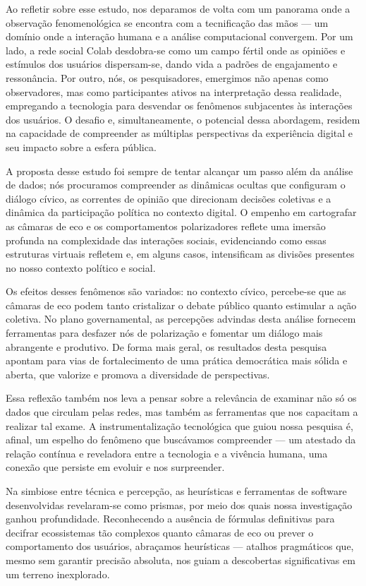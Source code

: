 Ao refletir sobre esse estudo, nos deparamos de volta com um panorama onde a observação fenomenológica se encontra com a tecnificação das mãos — um domínio onde a interação humana e a análise computacional convergem. Por um lado, a rede social Colab desdobra-se como um campo fértil onde as opiniões e estímulos dos usuários dispersam-se, dando vida a padrões de engajamento e ressonância. Por outro, nós, os pesquisadores, emergimos não apenas como observadores, mas como participantes ativos na interpretação dessa realidade, empregando a tecnologia para desvendar os fenômenos subjacentes às interações dos usuários. O desafio e, simultaneamente, o potencial dessa abordagem, residem na capacidade de compreender as múltiplas perspectivas da experiência digital e seu impacto sobre a esfera pública.

A proposta desse estudo foi sempre de tentar alcançar um passo além da análise de dados; nós procuramos compreender as dinâmicas ocultas que configuram o diálogo cívico, as correntes de opinião que direcionam decisões coletivas e a dinâmica da participação política no contexto digital. O empenho em cartografar as câmaras de eco e os comportamentos polarizadores reflete uma imersão profunda na complexidade das interações sociais, evidenciando como essas estruturas virtuais refletem e, em alguns casos, intensificam as divisões presentes no nosso contexto político e social.

Os efeitos desses fenômenos são variados: no contexto cívico, percebe-se que as câmaras de eco podem tanto cristalizar o debate público quanto estimular a ação coletiva. No plano governamental, as percepções advindas desta análise fornecem ferramentas para desfazer nós de polarização e fomentar um diálogo mais abrangente e produtivo. De forma mais geral, os resultados desta pesquisa apontam para vias de fortalecimento de uma prática democrática mais sólida e aberta, que valorize e promova a diversidade de perspectivas.

Essa reflexão também nos leva a pensar sobre a relevância de examinar não só os dados que circulam pelas redes, mas também as ferramentas que nos capacitam a realizar tal exame. A instrumentalização tecnológica que guiou nossa pesquisa é, afinal, um espelho do fenômeno que buscávamos compreender — um atestado da relação contínua e reveladora entre a tecnologia e a vivência humana, uma conexão que persiste em evoluir e nos surpreender.

Na simbiose entre técnica e percepção, as heurísticas e ferramentas de software desenvolvidas revelaram-se como prismas, por meio dos quais nossa investigação ganhou profundidade. Reconhecendo a ausência de fórmulas definitivas para decifrar ecossistemas tão complexos quanto câmaras de eco ou prever o comportamento dos usuários, abraçamos heurísticas — atalhos pragmáticos que, mesmo sem garantir precisão absoluta, nos guiam a descobertas significativas em um terreno inexplorado.

